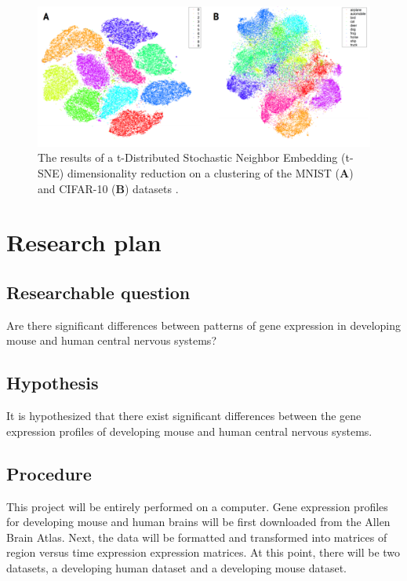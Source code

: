 \documentclass[12pt,oneside,onecolumn,a4paper]{article}
\begin{document}
\begin{figure}[H]
\begin{center}
\includegraphics[width=0.8\columnwidth]{figures/tsne}
\caption{The results of a t-Distributed Stochastic Neighbor Embedding (t-SNE) dimensionality reduction on a clustering of the MNIST (\textbf{A}) and CIFAR-10 (\textbf{B}) datasets \citep{laurensvandermaaten2014}.%
}
\end{center}
\end{figure}
\citep{yangCVPR2016joint}

\section{Research plan}


\subsection{Researchable question}
Are there significant differences between patterns of gene expression in developing mouse and human central nervous systems?

\subsection{Hypothesis}

It is hypothesized that there exist significant differences between the gene expression profiles of developing mouse and human central nervous systems.

\subsection{Procedure}
This project will be entirely performed on a computer. Gene expression profiles for developing mouse and human brains will be first downloaded from the Allen Brain Atlas. Next, the data will be formatted and transformed into matrices of region versus time expression expression matrices. At this point, there will be two datasets, a developing human dataset and a developing mouse dataset. 
\end{document}
